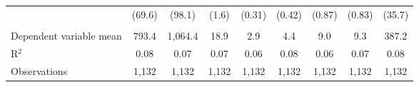 \begin{adjustbox}{width = \textwidth, center}
\begin{tabular}{lcccccccc}
                              & (69.6)        & (98.1)        & (1.6)        & (0.31)       & (0.42)       & (0.87)      & (0.83)      & (35.7)\\   
       \\
      Dependent variable mean & 793.4         & 1,064.4       & 18.9         & 2.9          & 4.4          & 9.0         & 9.3         & 387.2\\  
      R$^2$                   & 0.08          & 0.07          & 0.07         & 0.06         & 0.08         & 0.06        & 0.07        & 0.08\\  
      Observations            & 1,132         & 1,132         & 1,132        & 1,132        & 1,132        & 1,132       & 1,132       & 1,132\\  
      \bottomrule
   \end{tabular}
\end{adjustbox}
\par\endgroup


